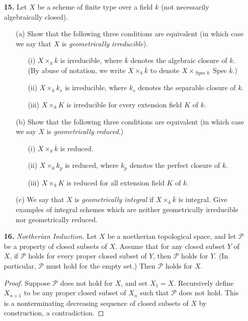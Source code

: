 \documentclass{article}
\DeclareMathOperator{\spec}{Spec}
\begin{document}
\begin{enumerate} [label=\textbf{\arabic*.}, leftmargin=0em]
\item[\textbf{15.}] Let $X$ be a scheme of finite type over a field $k$ (not necessarily algebraically closed).
\begin{itemize} [leftmargin=0em]
    \item[(a)] Show that the following three conditions are equivalent (in which case we say that $X$ is \textit{geometrically irreducible}).
    \begin{itemize}
        \item[(i)] $X \times_k \overline{k}$ is irreducible, where $\overline{k}$ denotes the algebraic closure of $k$. (By abuse of notation, we write $X \times_k \overline{k}$ to denote $X \times_{\spec{k}} \spec{\overline{k}}$.)
        \item[(ii)] $X \times_k k_s$ is irreducible, where $k_s$ denotes the separable closure of $k$.
        \item[(iii)] $X \times_k K$ is irreducible for every extension field $K$ of $k$.
    \end{itemize}
    \item[(b)] Show that the following three conditions are equivalent (in which case we say $X$ is \textit{geometrically reduced}.)
    \begin{itemize}
        \item[(i)] $X \times_k \overline{k}$ is reduced.
        \item[(ii)] $X \times_k k_p$ is reduced, where $k_p$ denotes the perfect closure of $k$.
        \item[(iii)] $X \times_k K$ is reduced for all extension field $K$ of $k$.
    \end{itemize}
    \item[(c)] We say that $X$ is \textit{geometrically integral} if $X \times_k \overline{k}$ is integral. Give examples of integral schemes which are neither geometrically irreducible nor geometrically reduced.
\end{itemize}

\item[\textbf{16.}] \textit{Noetherian Induction.} Let $X$ be a noetherian topological space, and let $\mathscr{P}$ be a property of closed subsets of $X$. Assume that for any closed subset $Y$ of $X$, if $\mathscr{P}$ holds for every proper closed subset of $Y$, then $\mathscr{P}$ holds for $Y$. (In particular, $\mathscr{P}$ must hold for the empty set.) Then $\mathscr{P}$ holds for $X$.

\begin{proof}
    Suppose $\mathscr{P}$ does not hold for $X$, and set $X_1 = X$. Recursively define $X_{n + 1}$ to be any proper closed subset of $X_{n}$ such that $\mathscr{P}$ does not hold. This is a nonterminating decreasing sequence of closed subsets of $X$ by construction, a contradiction.
\end{proof}


\end{enumerate}
\end{document}

